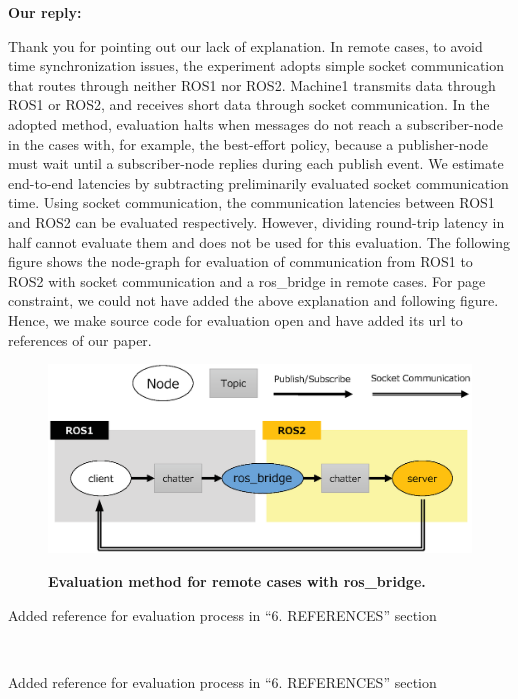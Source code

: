 \documentclass{article}
\begin{document}
\begin{enumerate}
  \begin{flushleft}
    \textbf{Our reply:}
  \end{flushleft}
  Thank you for pointing out our lack of explanation.
  In remote cases, to avoid time synchronization issues, the experiment adopts simple socket communication that routes through neither ROS1 nor ROS2.
  Machine1 transmits data through ROS1 or ROS2, and receives short data through socket communication.
  In the adopted method, evaluation halts when messages do not reach a subscriber-node in the cases with, for example, the  best-effort policy, because a publisher-node must wait until a subscriber-node replies during each publish event.
  We estimate end-to-end latencies by subtracting preliminarily evaluated socket communication time.
  Using socket communication, the communication latencies between ROS1 and ROS2 can be evaluated respectively. 
  However, dividing round-trip latency in half cannot evaluate them and does not be used for this evaluation.
  The following figure shows the node-graph for evaluation of communication from ROS1 to ROS2 with socket communication and a ros\_bridge in remote cases.
  For page constraint, we could not have added the above explanation and following figure.
  Hence, we make source code for evaluation open and have added its url to references of our paper.
  \begin{figure}[H]
    \centering
    \includegraphics[width=.6\linewidth]{../../figure/eval_method.eps}
    \begin{center}
      \textbf{Evaluation method for remote cases with ros\_bridge.}
    \end{center}
  \end{figure}
  \begin{itembox}[|]{Added reference for evaluation process in ``6. REFERENCES'' section}
  \end{itembox}\\
  \begin{itembox}[|]{Added reference for evaluation process in ``6. REFERENCES'' section}
  \end{itembox}\\


\end{enumerate}
\end{document}
